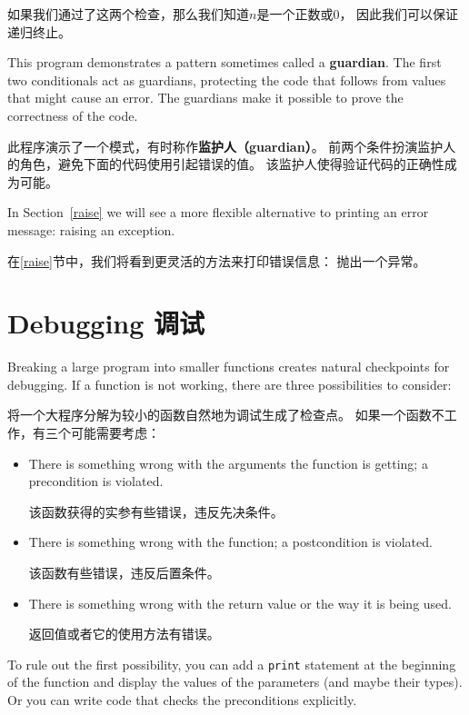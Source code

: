 \documentclass[10pt]{book}
\begin{document}
\begin{CJK}{UTF8}{gbsn}
如果我们通过了这两个检查，那么我们知道$n$是一个正数或0，
因此我们可以保证递归终止。

This program demonstrates a pattern sometimes called a {\bf guardian}.
The first two conditionals act as guardians, protecting the code that
follows from values that might cause an error.  The guardians make it
possible to prove the correctness of the code.

此程序演示了一个模式，有时称作{\bf 监护人（guardian）}。
前两个条件扮演监护人的角色，避免下面的代码使用引起错误的值。
该监护人使得验证代码的正确性成为可能。

In Section~\ref{raise} we will see a more flexible alternative to printing
an error message: raising an exception.

在\ref{raise}节中，我们将看到更灵活的方法来打印错误信息：
抛出一个异常。

\section{Debugging 调试}
\label{factdebug}

Breaking a large program into smaller functions creates natural
checkpoints for debugging.  
If a function is not working, there are
three possibilities to consider:

将一个大程序分解为较小的函数自然地为调试生成了检查点。
如果一个函数不工作，有三个可能需要考虑：

\begin{itemize}

\item There is something wrong with the arguments the function
is getting; a precondition is violated.

该函数获得的实参有些错误，违反先决条件。

\item There is something wrong with the function; a postcondition
is violated.

该函数有些错误，违反后置条件。

\item There is something wrong with the return value or the
way it is being used.

返回值或者它的使用方法有错误。

\end{itemize}

To rule out the first possibility, you can add a {\tt print} statement
at the beginning of the function and display the values of the
parameters (and maybe their types).  Or you can write code
that checks the preconditions explicitly.


\end{CJK}
\end{document}
